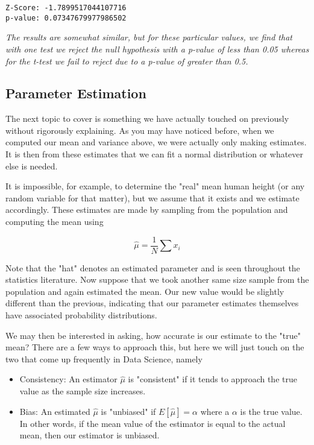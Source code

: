 \documentclass[11pt]{article}
\providecommand{\tightlist}{%
      \setlength{\itemsep}{0pt}\setlength{\parskip}{0pt}}
\begin{document}
    \begin{Verbatim}[commandchars=\\\{\}]
Z-Score: -1.7899517044107716
p-value: 0.07347679977986502

    \end{Verbatim}

    \emph{The results are somewhat similar, but for these particular values,
we find that with one test we reject the null hypothesis with a p-value
of less than 0.05 whereas for the t-test we fail to reject due to a
p-value of greater than 0.5.}

    \subsection{Parameter Estimation}\label{parameter-estimation}

The next topic to cover is something we have actually touched on
previously without rigorously explaining. As you may have noticed
before, when we computed our mean and variance above, we were actually
only making estimates. It is then from these estimates that we can fit a
normal distribution or whatever else is needed.

It is impossible, for example, to determine the "real" mean human height
(or any random variable for that matter), but we assume that it exists
and we estimate accordingly. These estimates are made by sampling from
the population and computing the mean using

\[\hat{\mu} = \frac{1}{N}\sum{x_i}\]

Note that the "hat" denotes an estimated parameter and is seen
throughout the statistics literature. Now suppose that we took another
same size sample from the population and again estimated the mean. Our
new value would be slightly different than the previous, indicating that
our parameter estimates themselves have associated probability
distributions.

We may then be interested in asking, how accurate is our estimate to the
"true" mean? There are a few ways to approach this, but here we will
just touch on the two that come up frequently in Data Science, namely

\begin{itemize}
\tightlist
\item
  Consistency: An estimator \(\hat{\mu}\) is "consistent" if it tends to
  approach the true value as the sample size increases.
\item
  Bias: An estimated \(\hat{\mu}\) is "unbiased" if
  \(E[\hat{\mu}] = \alpha\) where a \(\alpha\) is the true value. In
  other words, if the mean value of the estimator is equal to the actual
  mean, then our estimator is unbiased.
\end{itemize}
\end{document}
